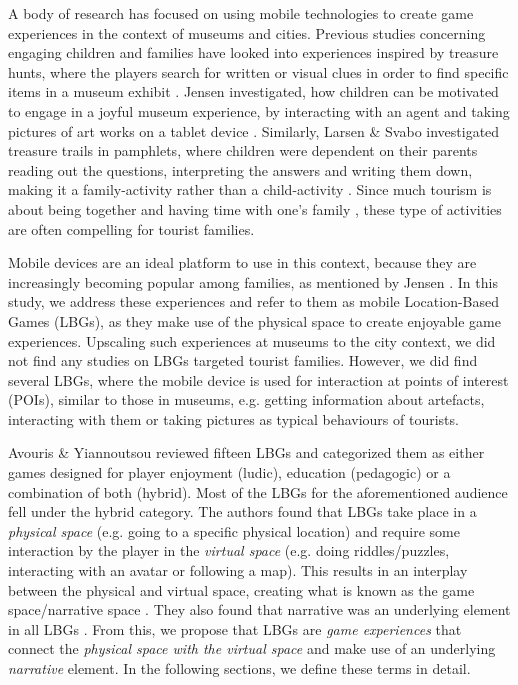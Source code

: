 A body of research has focused on using mobile technologies to create game experiences in the context of museums and cities. Previous studies concerning engaging children and families have looked into experiences inspired by treasure hunts, where the players search for written or visual clues in order to find specific items in a museum exhibit \cite{Lynge} \cite{larsen2014tourist}. Jensen investigated, how children can be motivated to engage in a joyful museum experience, by interacting with an agent and taking pictures of art works on a tablet device \cite{Lynge}. Similarly, Larsen \& Svabo investigated treasure trails in pamphlets, where children were dependent on their parents reading out the questions, interpreting the answers and writing them down, making it a family-activity rather than a child-activity \cite{larsen2014tourist}. Since much tourism is about being together and having time with one’s family \cite{larsen2014tourist}, these type of activities are often compelling for tourist families. 

Mobile devices are an ideal platform to use in this context, because they are increasingly becoming popular among families, as mentioned by Jensen \cite{Lynge}. In this study, we address these experiences and refer to them as mobile Location-Based Games (LBGs), as they make use of the physical space to create enjoyable game experiences. Upscaling such experiences at museums to the city context, we did not find any studies on LBGs targeted tourist families. However, we did find several LBGs, where the mobile device is used for interaction at points of interest (POIs), similar to those in museums, e.g. getting information about artefacts, interacting with them or taking pictures as typical behaviours of tourists. 

Avouris \& Yiannoutsou reviewed fifteen LBGs and categorized them as either games designed for player enjoyment (ludic), education (pedagogic) or a combination of both (hybrid). Most of the LBGs for the aforementioned audience fell under the hybrid category. The authors found that LBGs take place in a \textit{physical space} (e.g. going to a specific physical location) and require some interaction by the player in the \textit{virtual space} (e.g. doing riddles/puzzles, interacting with an avatar or following a map). This results in an interplay between the physical and virtual space, creating what is known as the game space/narrative space \cite{LBG_Review}. They also found that narrative was an underlying element in all LBGs \cite{LBG_Review}. From this, we propose that LBGs are \textit{game experiences} that connect the \textit{physical space with the virtual space} and make use of an underlying \textit{narrative} element. In the following sections, we define these terms in detail. 
